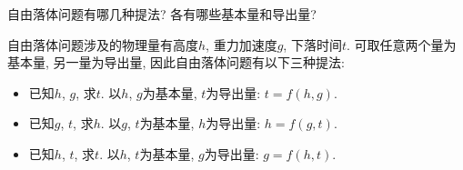 \begin{problem}[03]
自由落体问题有哪几种提法? 各有哪些基本量和导出量?
\end{problem}

\begin{solution}
\begin{minipage}[c]{0.8\linewidth}
自由落体问题涉及的物理量有高度$h$, 重力加速度$g$, 下落时间$t$. 可取任意两个量为基本量, 另一量为导出量, 因此自由落体问题有以下三种提法:
\begin{itemize}
\item 已知$h$, $g$, 求$t$. 以$h$, $g$为基本量, $t$为导出量: $t = f(h,g)$.
\item 已知$g$, $t$, 求$h$. 以$g$, $t$为基本量, $h$为导出量: $h = f(g,t)$.
\item 已知$h$, $t$, 求$t$. 以$h$, $t$为基本量, $g$为导出量: $g = f(h,t)$.
\end{itemize}
\end{minipage}
\begin{minipage}[c]{0.2\linewidth}
\begin{center}

\end{center}
\end{minipage}
\end{solution}
